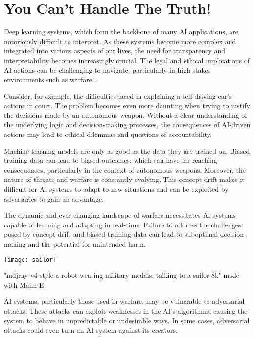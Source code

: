 \section{You Can't Handle The Truth!}

Deep learning systems, which form the backbone of many AI applications, are notoriously difficult to interpret. As these systems become more complex and integrated into various aspects of our lives, the need for transparency and interpretability becomes increasingly crucial. The legal and ethical implications of AI actions can be challenging to navigate, particularly in high-stakes environments such as warfare .

Consider, for example, the difficulties faced in explaining a self-driving car's actions in court. The problem becomes even more daunting when trying to justify the decisions made by an autonomous weapon. Without a clear understanding of the underlying logic and decision-making processes, the consequences of AI-driven actions may lead to ethical dilemmas and questions of accountability.

Machine learning models are only as good as the data they are trained on. Biased training data can lead to biased outcomes, which can have far-reaching consequences, particularly in the context of autonomous weapons. Moreover, the nature of threats and warfare is constantly evolving. This concept drift makes it difficult for AI systems to adapt to new situations and can be exploited by adversaries to gain an advantage.

The dynamic and ever-changing landscape of warfare necessitates AI systems capable of learning and adapting in real-time. Failure to address the challenges posed by concept drift and biased training data can lead to suboptimal decision-making and the potential for unintended harm.

\begin{pdf}
\begin{marginfigure}[-5.5cm]
        \texttt{[image: sailor]}
        \caption{"mdjrny-v4 style a robot wearing military medals, talking to a sailor 8k" made with Mann-E}
\end{marginfigure}
\end{pdf}

AI systems, particularly those used in warfare, may be vulnerable to adversarial attacks. These attacks can exploit weaknesses in the AI's algorithms, causing the system to behave in unpredictable or undesirable ways. In some cases, adversarial attacks could even turn an AI system against its creators.

